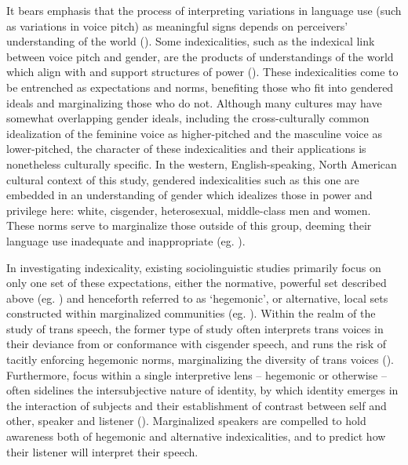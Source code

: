 \documentclass[12pt,twoside]{reedthesis}
\begin{document}
It bears emphasis that the process of interpreting variations in language use (such as variations in voice pitch) as meaningful signs depends on perceivers' understanding of the world (\cite{gal_signs_2019}). Some indexicalities, such as the indexical link between voice pitch and gender, are the products of understandings of the world which align with and support structures of power (\cite{calder_whose_2021}). These indexicalities come to be entrenched as expectations and norms, benefiting those who fit into gendered ideals and marginalizing those who do not. Although many cultures may have somewhat overlapping gender ideals, including the cross-culturally common idealization of the feminine voice as higher-pitched and the masculine voice as lower-pitched, the character of these indexicalities and their applications is nonetheless culturally specific. In the western, English-speaking, North American cultural context of this study, gendered indexicalities such as this one are embedded in an understanding of gender which idealizes those in power and privilege here: white, cisgender, heterosexual, middle-class men and women. These norms serve to marginalize those outside of this group, deeming their language use inadequate and inappropriate (eg. \cite{inoue_vicarious_2006, inoue_listening_2003, flores_undoing_2015, heffernan_constructing_2023}).

In investigating indexicality, existing sociolinguistic studies primarily focus on only one set of these expectations, either the normative, powerful set described above (eg. \cite{hazenberg_language_2012, podesva_sexuality_2015}) and henceforth referred to as `hegemonic', or  alternative, local sets constructed within marginalized communities (eg. \cite{mendoza_that_2024, calder_sissy_2019}). Within the realm of the study of trans speech, the former type of study often interprets trans voices in their deviance from or conformance with cisgender speech, and runs the risk of tacitly enforcing hegemonic norms, marginalizing the diversity of trans voices (\cite{calder_interrogating_2025}). Furthermore, focus within a single interpretive lens -- hegemonic or otherwise -- often sidelines the intersubjective nature of identity, by which identity emerges in the interaction of subjects and their establishment of contrast between self and other, speaker and listener (\cite{bucholtz_locating_2010}). Marginalized speakers are compelled to hold awareness both of hegemonic and alternative indexicalities, and to predict how their listener will interpret their speech.
\end{document}
